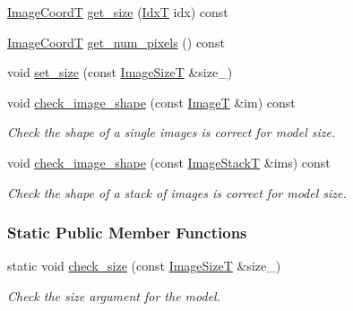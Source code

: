 \begin{DoxyCompactItemize}
\item 
\hyperlink{classmappel_1_1ImageFormat1DBase_a82ab3168eb1a87eaeb3e7c919188e9fc}{Image\+CoordT} \hyperlink{classmappel_1_1ImageFormat1DBase_a995bdd3b1be616d8d87af3a4a51fbad8}{get\+\_\+size} (\hyperlink{namespacemappel_ab17ec0f30b61ece292439d7ece81d3a8}{IdxT} idx) const 
\item 
\hyperlink{classmappel_1_1ImageFormat1DBase_a82ab3168eb1a87eaeb3e7c919188e9fc}{Image\+CoordT} \hyperlink{classmappel_1_1ImageFormat1DBase_a96644883bef9d230eea893ece4578e96}{get\+\_\+num\+\_\+pixels} () const 
\item 
void \hyperlink{classmappel_1_1ImageFormat1DBase_ad169407f15bd43b0cec18fa2c88725b7}{set\+\_\+size} (const \hyperlink{classmappel_1_1ImageFormat1DBase_a6456bab2b26702022ee32ae19e90dcac}{Image\+SizeT} \&size\+\_\+)
\item 
void \hyperlink{classmappel_1_1ImageFormat1DBase_af308ca86f413f65e72ea7b8c890bd87a}{check\+\_\+image\+\_\+shape} (const \hyperlink{classmappel_1_1ImageFormat1DBase_a521a1ff391a52a636fac4aac7c7ba02c}{ImageT} \&im) const 
\begin{DoxyCompactList}\small\item\em Check the shape of a single images is correct for model size. \end{DoxyCompactList}\item 
void \hyperlink{classmappel_1_1ImageFormat1DBase_a8d5c0744643bf0bbbf30dd3122f98190}{check\+\_\+image\+\_\+shape} (const \hyperlink{classmappel_1_1ImageFormat1DBase_a81e3246d1c5c37ebf9077b7b5bd25a76}{Image\+StackT} \&ims) const 
\begin{DoxyCompactList}\small\item\em Check the shape of a stack of images is correct for model size. \end{DoxyCompactList}\end{DoxyCompactItemize}
\subsubsection*{Static Public Member Functions}
\begin{DoxyCompactItemize}
\item 
static void \hyperlink{classmappel_1_1ImageFormat1DBase_a2eb986335c4d1405de65217456735ba4}{check\+\_\+size} (const \hyperlink{classmappel_1_1ImageFormat1DBase_a6456bab2b26702022ee32ae19e90dcac}{Image\+SizeT} \&size\+\_\+)
\begin{DoxyCompactList}\small\item\em Check the size argument for the model. \end{DoxyCompactList}\end{DoxyCompactItemize}
